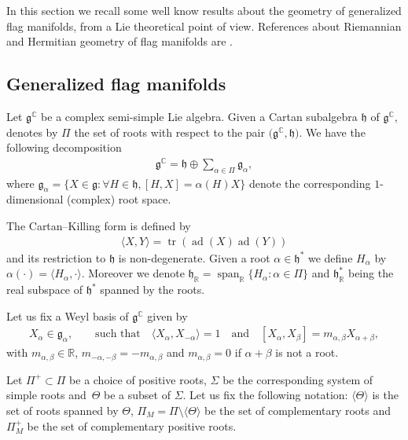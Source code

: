 \documentclass[10pt,a4paper]{amsart}
\numberwithin{equation}{section}
\DeclareMathOperator{\tr}{tr}
\DeclareMathOperator{\ad}{ad}
\DeclareMathOperator{\Span}{span}
\begin{document}
In this section we recall some well know results about the geometry of generalized flag manifolds, from a Lie theoretical point of view. References about Riemannian and Hermitian geometry of flag manifolds are \cite{alek-flag,grego, besse,rita, sn}.
\subsection{Generalized flag manifolds}
Let $\mathfrak{g}^\mathbb{C}$ be a complex semi-simple Lie algebra. Given a Cartan subalgebra $\mathfrak{h}$ of $\mathfrak{g}^\mathbb{C}$, denotes by $\Pi$ the set of roots with respect to the pair $\big(\mathfrak{g}^\mathbb{C},\mathfrak{h}\big)$. We have the following decomposition
\begin{gather*}
\mathfrak{g}^\mathbb{C}=\mathfrak{h}\oplus\sum_{\alpha\in \Pi}\mathfrak{g}_{\alpha},
\end{gather*}
where $\mathfrak{g}_{\alpha}=\{X\in\mathfrak{g}\colon \forall H\in \mathfrak{h},[H,X]=\alpha(H)X \}$ denote the corresponding $1$-dimensional (complex) root space.

The Cartan--Killing form is defined by
\begin{gather*}
\langle X,Y\rangle=\tr(\ad(X)\ad(Y))
\end{gather*}
and its restriction to $\mathfrak{h}$ is non-degenerate. Given a root $\alpha\in \mathfrak{h}^{*}$ we define $H_{\alpha}$ by $\alpha(\cdot)=\langle H_{\alpha},\cdot\rangle$. Moreover we denote $\mathfrak{h}_{\mathbb{R}}=\Span_{\mathbb{R}}\{H_{\alpha}\colon \alpha\in \Pi\}$ and $\mathfrak{h}_{\mathbb{R}}^{*}$ being the real subspace of $\mathfrak{h}^{*}$ spanned by the roots.

Let us fix a Weyl basis of $\mathfrak{g}^\mathbb{C}$ given by
\begin{gather*}
X_{\alpha}\in\mathfrak{g}_{\alpha}, \qquad \text{such that} \quad
\langle X_{\alpha},X_{-\alpha}\rangle=1 \quad \text{and} \quad [X_{\alpha},X_{\beta}]=m_{\alpha,\beta}X_{\alpha+\beta},
\end{gather*}
with $m_{\alpha,\beta}\in\mathbb{R}$, $m_{-\alpha,-\beta}=-m_{\alpha,\beta}$ and $m_{\alpha,\beta}=0$ if $\alpha+\beta$ is not a root.

Let $\Pi^{+}\subset \Pi$ be a choice of positive roots, $\Sigma$ be the corresponding system of simple roots and~$\Theta$ be a subset of $\Sigma$. Let us fix the following notation: $\langle\Theta\rangle$ is the set of roots spanned by $\Theta$, $\Pi_{M}=\Pi\setminus\langle{\Theta}\rangle$ be the set of complementary roots and $\Pi_{M}^{+}$ be the set of complementary positive roots.
\end{document}
